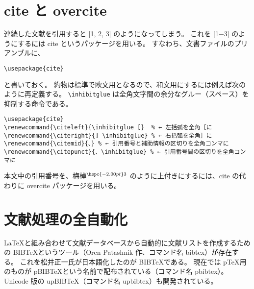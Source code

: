 \section{cite と overcite}
連続した文献を引用すると [1, 2, 3] のようになってしまう。
これを [1$-$3] のようにするには cite というパッケージを用いる。
すなわち、文書ファイルのプリアンブルに、
\begin{mdframed}[roundcorner=0.50zw,leftmargin=3.00zw,rightmargin=3.00zw,skipabove=0.40zw,skipbelow=0.40zw,innertopmargin=4.00pt,innerbottommargin=4.00pt,innerleftmargin=5.00pt,innerrightmargin=5.00pt,linecolor=gray!020,linewidth=0.50pt,backgroundcolor=gray!20]
\begin{verbatim}
\usepackage{cite}
\end{verbatim}
\end{mdframed}
と書いておく。
約物は標準で欧文用となるので、和文用にするには例えば次のように再定義する。
\verb'\inhibitglue' は全角文字間の余分なグルー（スペース）を抑制する命令である。
\begin{mdframed}[roundcorner=0.50zw,leftmargin=3.00zw,rightmargin=3.00zw,skipabove=0.40zw,skipbelow=0.40zw,innertopmargin=4.00pt,innerbottommargin=4.00pt,innerleftmargin=5.00pt,innerrightmargin=5.00pt,linecolor=gray!020,linewidth=0.50pt,backgroundcolor=gray!20]
\begin{verbatim}
\usepackage{cite}
\renewcommand{\citeleft}{\inhibitglue [}  % ← 左括弧を全角［に
\renewcommand{\citeright}{] \inhibitglue} % ← 右括弧を全角］に
\renewcommand{\citemid}{、} % ← 引用番号と補助情報の区切りを全角コンマに
\renewcommand{\citepunct}{、\inhibitglue} % ← 引用番号間の区切りを全角コンマに
\end{verbatim}
\end{mdframed}
本文中の引用番号を、梅棹${}^{\hspc{-2.00pt}3}$ のように上付きにするには、cite の代わりに overcite パッケージを用いる。
\section{文献処理の全自動化}
\LaTeX{}と組み合わせて文献データベースから自動的に文献リストを作成するための B{\scriptsize IB}\hspc{-1.50pt}\TeX{}というツール（Oren Patashnik 作、コマンド名 bibtex）が存在する。
これを松井正一{\small 氏}が日本語化したのが \raisebox{-1.50pt}{J}\hspc{-0.50pt}B{\scriptsize IB}\hspc{-1.50pt}\TeX{}である。
現在では p\TeX{}用のものが pB{\scriptsize IB}\hspc{-1.50pt}\TeX{}という名前で配布されている（コマンド名 pbibtex）。
Unicode 版の upB{\scriptsize IB}\hspc{-1.50pt}\TeX{}（コマンド名 upbibtex）も開発されている。\\

